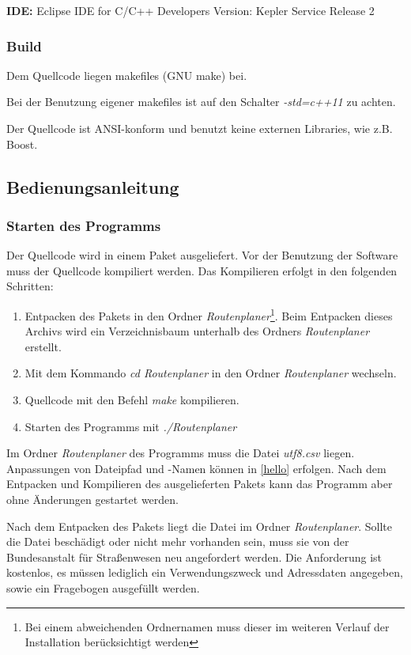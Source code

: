 \documentclass[12pt, a4paper, ngerman]{article}
\begin{document}
\textbf{IDE:}\newline
Eclipse IDE for C/C++ Developers \newline
Version: Kepler Service Release 2

\subsubsection{Build}
Dem Quellcode liegen makefiles (GNU make) bei.

Bei der Benutzung eigener makefiles ist auf den Schalter \textit{-std=c++11} zu achten. 

Der Quellcode ist ANSI-konform und benutzt keine externen Libraries, wie z.B. Boost.

\subsection{Bedienungsanleitung \label{Bedienungsanleitung}}
\subsubsection{Starten des Programms}
Der Quellcode wird in einem Paket ausgeliefert. Vor der Benutzung der Software muss der Quellcode kompiliert werden. Das Kompilieren erfolgt in den folgenden Schritten:
\begin{enumerate}
	\item Entpacken des Pakets in den Ordner \textit{Routenplaner}\footnote{Bei einem abweichenden Ordnernamen muss dieser im weiteren Verlauf der Installation berücksichtigt werden}. Beim Entpacken dieses Archivs wird ein Verzeichnisbaum unterhalb des Ordners \textit{Routenplaner} erstellt.
	\item Mit dem Kommando \textit{cd Routenplaner} in den Ordner \textit{Routenplaner} wechseln.
	\item Quellcode mit den Befehl \textit{make} kompilieren.
	\item Starten des Programms mit \textit{./Routenplaner}
\end{enumerate}

Im Ordner \textit{Routenplaner} des Programms muss die Datei \textit{utf8.csv} liegen. Anpassungen von Dateipfad und -Namen können in \ref{hello} erfolgen. Nach dem Entpacken und Kompilieren des ausgelieferten Pakets kann das Programm aber ohne Änderungen gestartet werden.

Nach dem Entpacken des Pakets liegt die Datei im Ordner \textit{Routenplaner}. Sollte die Datei beschädigt oder nicht mehr vorhanden sein, muss sie von der Bundesanstalt für Straßenwesen neu angefordert werden. Die Anforderung ist kostenlos, es müssen lediglich ein Verwendungszweck und Adressdaten angegeben, sowie ein Fragebogen ausgefüllt werden.
\end{document}
